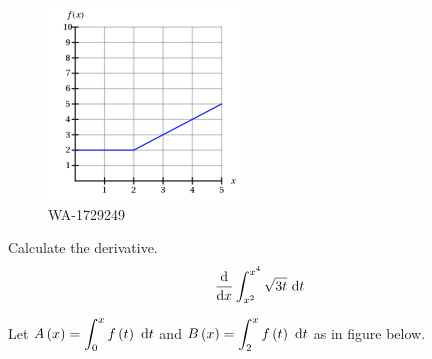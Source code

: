 \documentclass[12pt,addpoints, answers, fleqn]{exam}
\begin{document}
\begin{teacher}
\begin{questions}

\begin{figure}[htbp] %
   \centering
   \includegraphics[width=2in]{./graphics/1729249.pdf} 
   \caption{WA-1729249}
   \label{fig:1729249}
\end{figure}
 
\question 	%

Calculate the derivative.
\[
\frac{{\rm{d}}}{{\rm{d}}x} \int_{x^2}^{x^4} \sqrt{3t} \ {\rm{d}} t
\]
\begin{solution}
\end{solution}


\question 	%

Let $A\left(x\right) = \displaystyle \int_0^x f\left(t\right) \ {\rm{d}} t$ and  $B\left(x\right) = \displaystyle \int_2^x f\left(t\right) \ {\rm{d}} t$ as in figure below.



\end{questions}
\end{teacher}
\end{document}
